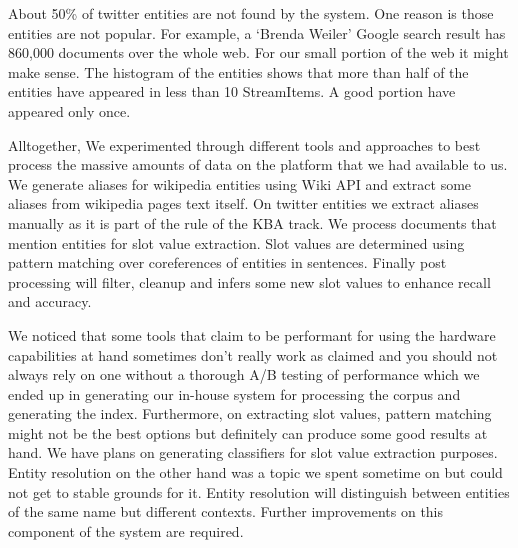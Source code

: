 About 50\% of twitter entities are not found by the system. One reason is those entities are not popular. For example, a `Brenda Weiler' Google search result has 860,000 documents over the whole web. For our small portion of the web it might make sense. The histogram of the entities shows that more than half of the entities have appeared in less than 10 StreamItems. A good portion have appeared only once.






Alltogether, We experimented through different tools and approaches to best process the massive amounts of data on the platform that we had available to us. We generate aliases for wikipedia entities using Wiki API and extract some aliases from wikipedia pages text itself. On twitter entities we extract aliases manually as it is part of the rule of the KBA track. We process documents that mention entities for slot value extraction. Slot values are determined using pattern matching over coreferences of entities in sentences. Finally post processing will filter, cleanup and infers some new slot values to enhance recall and accuracy. 

We noticed that some tools that claim to be performant for using the hardware capabilities at hand sometimes don't really work as claimed and you should not always rely on one without a thorough A/B testing of performance which we ended up in generating our in-house system for processing the corpus and generating the index. Furthermore, on extracting slot values, pattern matching might not be the best options but definitely can produce some good results at hand. We have plans on generating classifiers for slot value extraction 
purposes. Entity resolution on the other hand was a topic we spent sometime on but could not get to stable grounds for it. Entity resolution will distinguish between entities of the same name but different contexts. Further improvements on this component of the system are required. 
